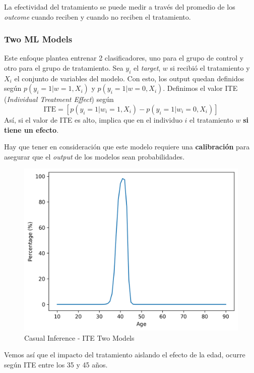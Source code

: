 La efectividad del tratamiento se puede medir a través del promedio de los \textit{outcome} cuando reciben y cuando no reciben el tratamiento. 

\subsubsection{Two ML Models}

Este enfoque plantea entrenar 2 clasificadores, uno para el grupo de control y otro para el grupo de tratamiento. Sea $y_i$ el \textit{target}, $w$ si recibió el tratamiento y $X_i$ el conjunto de variables del modelo. Con esto, los output quedan definidos según $p(y_i = 1 | w = 1, X_i)$ y $p(y_i = 1 | w = 0, X_i)$. 
Definimos el valor ITE (\textit{Individual Treatment Effect}) según 
$$
\text{ITE} = \left [ p(y_i = 1 | w_i = 1, X_i) - p(y_i = 1 | w_i = 0, X_i) \right ]
$$
Así, si el valor de ITE es alto, implica que en el individuo $i$ el tratamiento $w$ \textbf{si tiene un efecto}. 

Hay que tener en consideración que este modelo requiere una \textbf{calibración} para asegurar que el \textit{output} de los modelos sean probabilidades.

\begin{figure}[H]
    \center
    \includegraphics[scale=0.5]{notebooks/STATS/img/causal_inference_ite_two_models.png}
    \caption{Casual Inference - ITE Two Models}
\end{figure}

Vemos así que el impacto del tratamiento aislando el efecto de la edad, ocurre según ITE entre los 35 y 45 años. 





